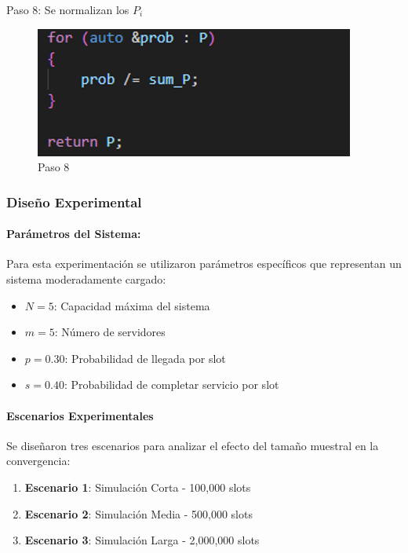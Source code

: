 \documentclass{article}
\begin{document}
Paso 8: Se normalizan los $P_i$
\begin{figure}[H]
    \centering
    \includegraphics[width=0.75\linewidth]{images/imageGeoGeoMCalc9.png}
    \caption{Paso 8}
    \label{fig:enter-label}
\end{figure}

\subsubsection{Diseño Experimental}

\paragraph{Parámetros del Sistema:}

Para esta experimentación se utilizaron parámetros específicos que representan un sistema moderadamente cargado:
\begin{itemize}
    \item $N=5$: Capacidad máxima del sistema
    \item $m=5$: Número de servidores
    \item $p=0.30$: Probabilidad de llegada por slot
    \item $s=0.40$: Probabilidad de completar servicio por slot
\end{itemize}

\paragraph{Escenarios Experimentales}
Se diseñaron tres escenarios para analizar el efecto del tamaño muestral en la convergencia:
\begin{enumerate}
    \item \textbf{Escenario 1}: Simulación Corta - 100,000 slots
    \item \textbf{Escenario 2}: Simulación Media - 500,000 slots
    \item \textbf{Escenario 3}: Simulación Larga - 2,000,000 slots
\end{enumerate}
\end{document}
